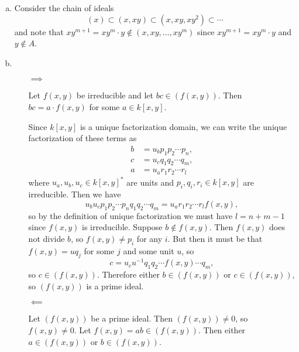 \documentclass{article}
\begin{document}
\begin{Answer}
  \begin{enumerate}[(a)]
    \item{
      Consider the chain of ideals
      $$
      (x) \subset (x, xy) \subset (x, xy, xy^2) \subset \cdots
      $$
      and note that $xy^{m+1} = xy^m \cdot y \notin (x, xy, \dots, xy^m)$
      since $xy^{m+1} = xy^m \cdot y$ and $y \notin A$.
    }
    \item{
      \begin{itemize}
        \item[$\implies$]{
          Let $f(x,y)$ be irreducible and let $bc \in (f(x,y))$. Then
          $bc = a \cdot f(x,y)$ for some $a \in k[x,y]$.

          Since $k[x,y]$ is a unique factorization domain, we can
          write the unique factorization of these terms as
          \begin{align*}
            b &= u_b p_1 p_2 \cdots p_n, \\
            c &= u_c q_1 q_2 \cdots q_m, \\
            a &= u_a r_1 r_2 \cdots r_l
          \end{align*}
          where $u_a, u_b, u_c \in k[x,y]^\ast$ are units and
          $p_i, q_i, r_i \in k[x,y]$ are irreducible. Then we have
          $$
            u_b u_c p_1 p_2 \cdots p_n q_1 q_2 \cdots q_m
          = u_a r_1 r_2 \cdots r_l f(x,y),
          $$
          so by the definition of unique factorization we must have
          $l =  n + m - 1$ since $f(x,y)$ is irreducible.
          Suppose $b \notin f(x,y)$. Then $f(x,y)$ does not divide
          $b$, so $f(x,y) \neq p_i$ for any $i$. But then it must be
          that $f(x,y) = u q_j$ for some $j$ and some unit $u$, so
          $$
          c = u_c u^{-1} q_1 q_2 \cdots f(x,y) \cdots q_m,
          $$
          so $c \in (f(x,y))$. Therefore either
          $b \in (f(x,y))$ or $c \in (f(x,y))$,
          so $(f(x,y))$ is a prime ideal.
        }
        \item[$\impliedby$]{
          Let $(f(x,y))$ be a prime ideal. Then $(f(x,y)) \neq 0$, so
          $f(x,y) \neq 0$. Let $f(x,y) = ab \in (f(x,y))$.
          Then either $a \in (f(x,y))$ or $b \in (f(x,y))$.

}
\end{itemize}}
\end{enumerate}
\end{Answer}
\end{document}
